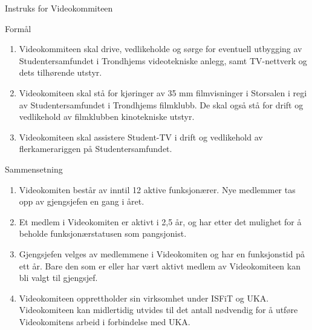 
\begin{instruks}{Instruks for Videokommiteen}{ }{ }
    
    \begin{instruksledd}{Formål}
        \begin{enumerate}
            \item Videokommiteen skal drive, vedlikeholde og sørge for 
eventuell
                utbygging av Studentersamfundet i
                Trondhjems videotekniske anlegg, samt TV-nettverk og dets tilhørende utstyr.
            \item Videokomiteen skal stå for kjøringer av 35 mm 
filmvisninger i
                Storsalen i regi av Studentersamfundet i
                Trondhjems filmklubb. De skal også stå for drift og vedlikehold av filmklubben
                kinotekniske utstyr.
            \item Videokomiteen skal assistere Student-TV i drift og 
vedlikehold av
                flerkamerariggen på Studentersamfundet.
        \end{enumerate}
    \end{instruksledd}

    \begin{instruksledd}{Sammensetning}
        \begin{enumerate}
            \item Videokomiten består av inntil 12 aktive funksjonærer. Nye medlemmer tas opp av
            gjengsjefen en gang i året.
            \item  Et medlem i Videokomiten er aktivt i 2,5 år, og har etter det mulighet for å
            beholde funksjonærstatusen som
            pangsjonist.
            \item Gjengsjefen velges av medlemmene i Videokomiten og har en funksjonstid på ett
            år. Bare den som er eller
            har vært aktivt medlem av Videokomiteen kan bli valgt til gjengsjef.
            \item Videokomiteen opprettholder sin virksomhet under ISFiT og UKA. Videokomiteen
            kan midlertidig utvides
            til det antall nødvendig for å utføre Videokomitens arbeid i forbindelse med UKA.
        \end{enumerate}
    \end{instruksledd}


\end{instruks}
